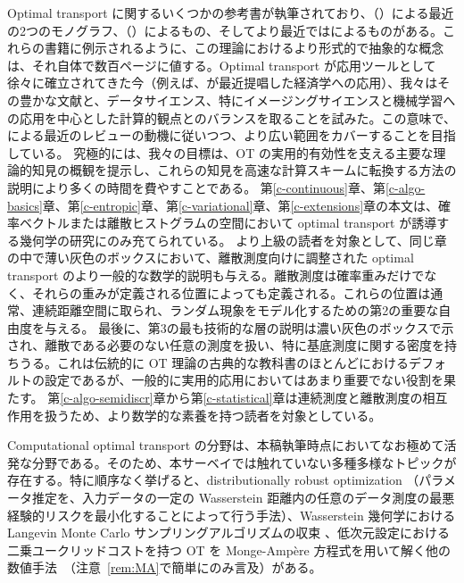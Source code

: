 Optimal transport に関するいくつかの参考書が執筆されており、\citeauthor{Villani03}（\citeyear{Villani03,Villani09}）による最近の2つのモノグラフ、\citeauthor{rachev1998mass}（\citeyear{rachev1998mass,rachev1998mass2}）によるもの、そしてより最近では\citet{SantambrogioBook}によるものがある。これらの書籍に例示されるように、この理論におけるより形式的で抽象的な概念は、それ自体で数百ページに値する。Optimal transport が応用ツールとして徐々に確立されてきた今（例えば、\citet{galichon2016optimal}が最近提唱した経済学への応用）、我々はその豊かな文献と、データサイエンス、特にイメージングサイエンスと機械学習への応用を中心とした計算的観点とのバランスを取ることを試みた。この意味で、\citet{kolouri2017optimal}による最近のレビューの動機に従いつつ、より広い範囲をカバーすることを目指している。
%
究極的には、我々の目標は、OT の実用的有効性を支える主要な理論的知見の概観を提示し、これらの知見を高速な計算スキームに転換する方法の説明により多くの時間を費やすことである。
%
第\ref{c-continuous}章、第\ref{c-algo-basics}章、第\ref{c-entropic}章、第\ref{c-variational}章、第\ref{c-extensions}章の本文は、確率ベクトルまたは離散ヒストグラムの空間において optimal transport が誘導する幾何学の研究にのみ充てられている。
%
より上級の読者を対象として、同じ章の中で薄い灰色のボックスにおいて、離散測度向けに調整された optimal transport のより一般的な数学的説明も与える。離散測度は確率重みだけでなく、それらの重みが定義される位置によっても定義される。これらの位置は通常、連続距離空間に取られ、ランダム現象をモデル化するための第2の重要な自由度を与える。
%
最後に、第3の最も技術的な層の説明は濃い灰色のボックスで示され、離散である必要のない任意の測度を扱い、特に基底測度に関する密度を持ちうる。これは伝統的に OT 理論の古典的な教科書のほとんどにおけるデフォルトの設定であるが、一般的に実用的応用においてはあまり重要でない役割を果たす。
%
第\ref{c-algo-semidiscr}章から第\ref{c-statistical}章は連続測度と離散測度の相互作用を扱うため、より数学的な素養を持つ読者を対象としている。

Computational optimal transport の分野は、本稿執筆時点においてなお極めて活発な分野である。そのため、本サーベイでは触れていない多種多様なトピックが存在する。特に順序なく挙げると、distributionally robust optimization \citep{NIPS2015_5745,esfahani2018data,NIPS2018_7534,NIPS2018_8015}（パラメータ推定を、入力データの一定の Wasserstein 距離内の任意のデータ測度の最悪経験的リスクを最小化することによって行う手法）、Wasserstein 幾何学における Langevin Monte Carlo サンプリングアルゴリズムの収束 \citep{dalalyan2017user,pmlr-v65-dalalyan17a,pmlr-v75-bernton18a}、低次元設定における二乗ユークリッドコストを持つ OT を Monge-Amp\`ere 方程式を用いて解く他の数値手法~\citep{froese2011convergent,benamou2014numerical,sulman2011efficient}（注意~\ref{rem:MA}で簡単にのみ言及）がある。


